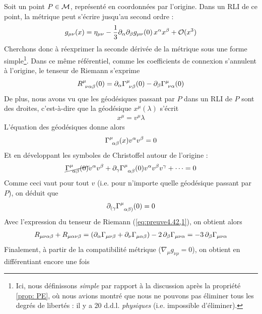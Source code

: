 Soit un point $P \in \mathcal{M}$, représenté en coordonnées par l'origine. Dans un RLI de ce point, la métrique peut s'écrire jusqu'au second ordre :
\begin{align}
    g_{\mu\nu}(x) = \eta_{\mu\nu} - \frac{1}{3} \partial_\alpha \partial_\beta g_{\mu\nu}(0)\,x^\alpha x^\beta + \mathcal{O}(x^3)
\end{align}
Cherchons donc à réexprimer la seconde dérivée de la métrique sous une forme simple\footnote{Ici, nous définissons \emph{simple} par rapport à la discussion après la propriété \ref{prop: PE}, où nous avions montré que nous ne pouvons pas éliminer tous les degrés de libertés : il y a 20 d.d.l. \emph{physiques} (i.e. impossible d'éliminer).}. Dans ce même référentiel, comme les coefficients de connexion s'annulent à l'origine, le tenseur de Riemann s'exprime 
\begin{align}
    \label{eq:preuve4.42,1}
    R\indices{^\mu_{\!\nu\alpha\beta}} (0) = \pd_\alpha \Gamma\indices{^\mu_{\!\nu\beta}} (0)- \pd_\beta \Gamma\indices{^\mu_{\!\nu\alpha}}(0)
\end{align}
De plus, nous avons vu que les géodésiques passant par $P$ dans un RLI de $P$ sont des droites, c'est-à-dire que la géodésique $x^\mu(\lambda)$ s'écrit
\begin{align}
    x^\mu = v^\mu \lambda
\end{align}
L'équation des géodésiques donne alors
\begin{align}
    \Gamma\indices{^\mu_{\!\alpha\beta}}(x) v^\alpha v^\beta = 0
\end{align}
Et en développant les symboles de Christoffel autour de l'origine :
\begin{align}
    \cancel{\Gamma\indices{^\mu_{\!\alpha\beta}}(0)} v^\alpha v^\beta + \pd_\gamma\Gamma\indices{^\mu_{\alpha\beta}}(0) v^\alpha v^\beta v^\gamma + \dots = 0
\end{align}
Comme ceci vaut pour tout $v$ (i.e. pour n'importe quelle géodésique passant par $P$), on déduit que
\begin{equation}
    \pd_{(\gamma}\Gamma\indices{^\mu_{\alpha\beta)}}(0) = 0 
\end{equation}
Avec l'expression du tenseur de Riemann (\ref{eq:preuve4.42,1}), on obtient alors
\begin{align}
    R_{\mu\nu\alpha\beta} + R_{\mu\alpha\nu\beta} = (\partial_\alpha \Gamma_{\mu\nu\beta}+ \partial_\nu \Gamma_{\mu\alpha\beta}) -2 \, \partial_\beta \Gamma_{\mu\nu\alpha} = - 3\,\partial_\beta \Gamma_{\mu\nu\alpha} 
\end{align}
Finalement, à partir de la compatibilité métrique ($\nabla_\mu g_{\nu\rho} = 0$), on obtient en différentiant encore une fois 
